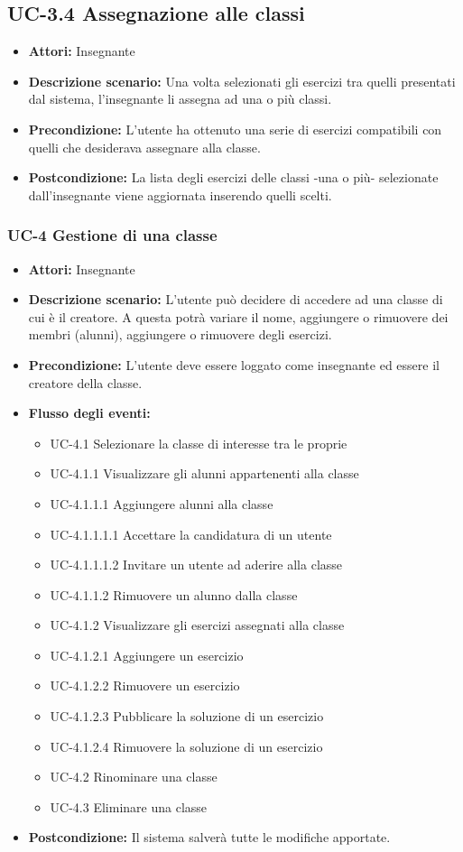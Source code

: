 \subsection{UC-3.4 Assegnazione alle classi}
\begin{itemize}
		\item \textbf{Attori: }Insegnante
		\item \textbf{Descrizione scenario: }Una volta selezionati gli esercizi tra quelli presentati dal sistema, l'insegnante li assegna ad una o più classi.
		\item \textbf{Precondizione: }L'utente ha ottenuto una serie di esercizi compatibili con quelli che desiderava assegnare alla classe.
		\item \textbf{Postcondizione: }La lista degli esercizi delle classi -una o più- selezionate dall'insegnante viene aggiornata inserendo quelli scelti.
\end{itemize}
\subsubsection{UC-4 Gestione di una classe}
\begin{itemize}
		\item \textbf{Attori: } Insegnante
		\item \textbf{Descrizione scenario: } L'utente può decidere di accedere ad una classe di cui è il creatore. A questa potrà variare il nome, aggiungere o rimuovere dei membri (alunni), aggiungere o rimuovere degli esercizi.
		\item \textbf{Precondizione: }  L'utente deve essere loggato come insegnante ed essere il creatore della classe. 
		\item \textbf{Flusso degli eventi: }
		\begin{itemize}
		\item UC-4.1 Selezionare la classe di interesse tra le proprie
		\item UC-4.1.1 Visualizzare gli alunni appartenenti alla classe
		\item UC-4.1.1.1 Aggiungere alunni alla classe 
		\item UC-4.1.1.1.1 Accettare la candidatura di un utente
		\item UC-4.1.1.1.2 Invitare un utente ad aderire alla classe
		\item UC-4.1.1.2 Rimuovere un alunno dalla classe
		\item UC-4.1.2 Visualizzare gli esercizi assegnati alla classe
		\item UC-4.1.2.1 Aggiungere un esercizio
		\item UC-4.1.2.2 Rimuovere un esercizio
		\item UC-4.1.2.3 Pubblicare la soluzione di un esercizio
		\item UC-4.1.2.4 Rimuovere la soluzione di un esercizio
		\item UC-4.2 Rinominare una classe
		\item UC-4.3 Eliminare una classe
		\end{itemize}
		\item \textbf{Postcondizione: } Il sistema salverà tutte le modifiche apportate. 
	\end{itemize}
	

